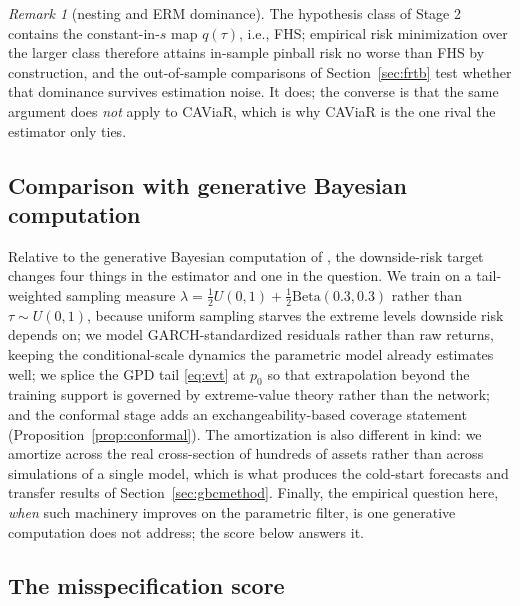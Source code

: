 \documentclass[11pt]{article}
\theoremstyle{remark}
\newtheorem{remark}{Remark}
\begin{document}
\begin{remark}[nesting and ERM dominance]\label{rem:nesting}
The hypothesis class of Stage 2 contains the constant-in-$s$ map
$q(\tau)$, i.e., FHS; empirical risk minimization over the larger class
therefore attains in-sample pinball risk no worse than FHS by
construction, and the out-of-sample comparisons of
Section~\ref{sec:frtb} test whether that dominance survives estimation
noise. It does; the converse is that the same argument does
\emph{not} apply to CAViaR, which is why CAViaR is the one rival the
estimator only ties.
\end{remark}

\subsection{Comparison with generative Bayesian computation}\label{sec:polsondelta}

Relative to the generative Bayesian computation of
\citet{polson2023gbc}, the downside-risk target changes four things in
the estimator and one in the question. We train on a tail-weighted
sampling measure $\lambda = \tfrac12 U(0,1) + \tfrac12
\mathrm{Beta}(0.3,0.3)$ rather than $\tau\sim U(0,1)$, because
uniform sampling starves the extreme levels downside risk depends on;
we model GARCH-standardized residuals rather than raw returns, keeping
the conditional-scale dynamics the parametric model already estimates
well; we splice the GPD tail \eqref{eq:evt} at $p_0$ so that
extrapolation beyond the training support is governed by extreme-value
theory rather than the network; and the conformal stage adds an
exchangeability-based coverage statement
(Proposition~\ref{prop:conformal}). The amortization is also different
in kind: we amortize across the real cross-section of hundreds of
assets rather than across simulations of a single model, which is what
produces the cold-start forecasts and transfer results of
Section~\ref{sec:gbcmethod}. Finally, the empirical question here,
\emph{when} such machinery improves on the parametric filter, is one
generative computation does not address; the score below answers
it.

\subsection{The misspecification score}\label{sec:score}
\end{document}

